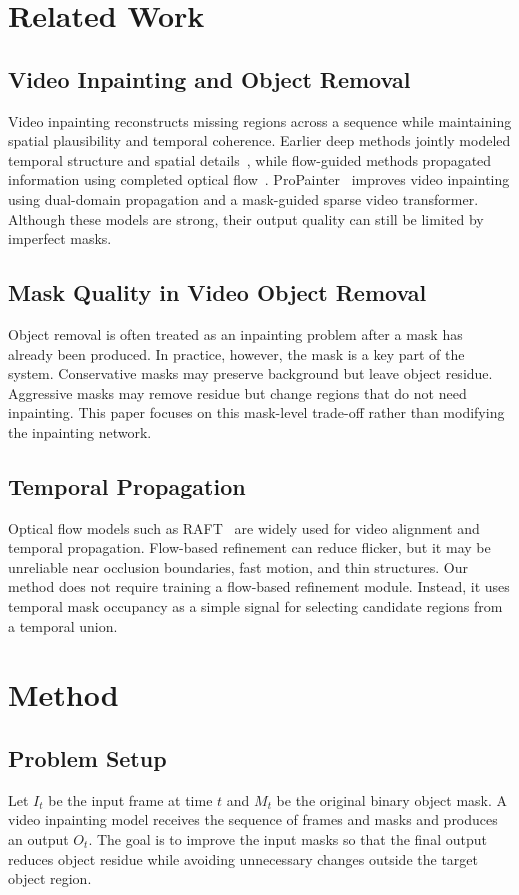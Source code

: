\documentclass[nouppercase]{kaia}
\begin{document}
\section{Related Work}
\subsection{Video Inpainting and Object Removal}
Video inpainting reconstructs missing regions across a sequence while maintaining spatial plausibility and temporal coherence. Earlier deep methods jointly modeled temporal structure and spatial details~\cite{wang2018video}, while flow-guided methods propagated information using completed optical flow~\cite{xu2019deep}. ProPainter~\cite{zhou2023propainter} improves video inpainting using dual-domain propagation and a mask-guided sparse video transformer. Although these models are strong, their output quality can still be limited by imperfect masks.

\subsection{Mask Quality in Video Object Removal}
Object removal is often treated as an inpainting problem after a mask has already been produced. In practice, however, the mask is a key part of the system. Conservative masks may preserve background but leave object residue. Aggressive masks may remove residue but change regions that do not need inpainting. This paper focuses on this mask-level trade-off rather than modifying the inpainting network.

\subsection{Temporal Propagation}
Optical flow models such as RAFT~\cite{teed2020raft} are widely used for video alignment and temporal propagation. Flow-based refinement can reduce flicker, but it may be unreliable near occlusion boundaries, fast motion, and thin structures. Our method does not require training a flow-based refinement module. Instead, it uses temporal mask occupancy as a simple signal for selecting candidate regions from a temporal union.

\section{Method}
\subsection{Problem Setup}
Let $I_t$ be the input frame at time $t$ and $M_t$ be the original binary object mask. A video inpainting model receives the sequence of frames and masks and produces an output $O_t$. The goal is to improve the input masks so that the final output reduces object residue while avoiding unnecessary changes outside the target object region.
\end{document}
